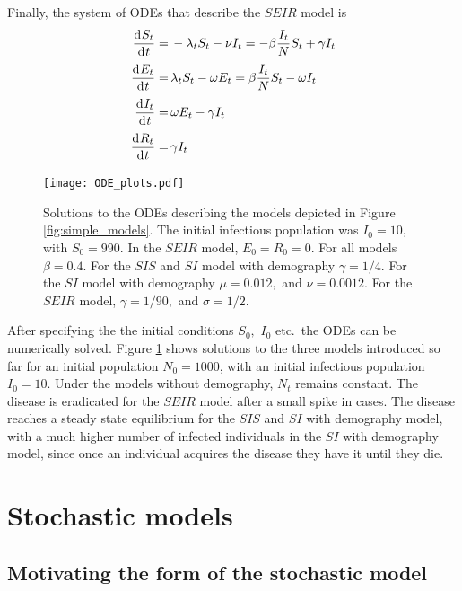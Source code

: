 Finally, the system of ODEs that describe the $SEIR$ model is \begin{align}
    \frac{\diff S_t}{\diff t}
    = & \, - \lambda_t S_t - \nu I_t
    = -\beta \frac{I_t}{N}S_t + \gamma I_t \label{eq:SEIR_1} \\
    \frac{\diff E_t}{\diff t}
    = & \, \lambda_t S_t - \omega E_t
    = \beta \frac{I_t}{N}S_t - \omega I_t \label{eq:SEIR_2}  \\
    \frac{\diff I_t}{\diff t}
    = & \, \omega E_t - \gamma I_t \label{eq:SEIR_3}         \\
    \frac{\diff R_t}{\diff t}
    = & \, \gamma I_t \label{eq:SEIR_4}
\end{align}

\begin{figure}[htbp]
    \centering
    \texttt{[image: ODE\_plots.pdf]}
    \caption{
        Solutions to the ODEs describing the models
        depicted in Figure \ref{fig:simple_models}. The initial infectious
        population was $I_0 = 10,$ with $S_0 = 990.$ In the $SEIR$ model,
        $E_0 = R_0 = 0.$ For all models $\beta = 0.4.$ For the $SIS$ and $SI$
        model with demography $\gamma = 1/4.$ For the $SI$ model with
        demography $\mu = 0.012,$ and $\nu = 0.0012.$ For the $SEIR$ model,
        $\gamma = 1/90,$ and $\sigma = 1/2.$
    }
    \label{fig:ODE_outputs}
\end{figure}

After specifying the the initial conditions $S_0,$ $I_0$ etc.\
the ODEs can be numerically solved. Figure \ref{fig:ODE_outputs} shows
solutions to the three models introduced so far for an initial population
$N_0 = 1000$, with an initial infectious population $I_0 = 10.$ Under the
models without demography, $N_t$ remains constant. The disease is eradicated
for the $SEIR$ model after a small spike in cases. The disease reaches a
steady state equilibrium for the $SIS$ and
$SI$ with demography model, with a much higher number of infected individuals
in the $SI$ with demography model, since once an individual acquires the
disease they have it until they die.

\section{Stochastic models}

\subsection*{Motivating the form of the stochastic model}

